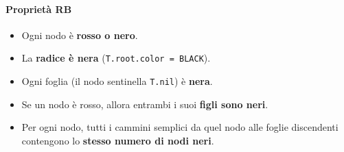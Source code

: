 \paragraph{Proprietà RB}
\begin{itemize}
    \item Ogni nodo è \textbf{rosso o nero}.
    \item La \textbf{radice è nera} (\texttt{T.root.color = BLACK}).
    \item Ogni foglia (il nodo sentinella \texttt{T.nil}) è \textbf{nera}.
    \item Se un nodo è rosso, allora entrambi i suoi \textbf{figli sono neri}.
    \item Per ogni nodo, tutti i cammini semplici da quel nodo alle foglie discendenti contengono lo \textbf{stesso numero di nodi neri}.
\end{itemize}

